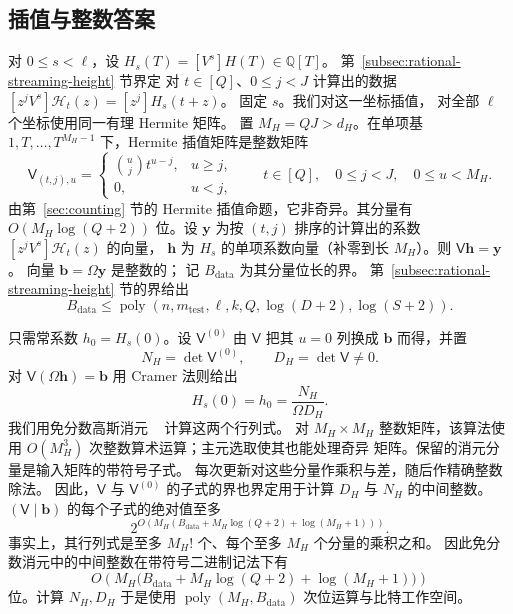 \documentclass[11pt,reqno]{amsart}
\numberwithin{equation}{section}
\theoremstyle{definition}\newtheorem{definition}[theorem]{定义}
\theoremstyle{remark}\newtheorem{remark}[theorem]{注}
\newcommand{\poly}{\operatorname{poly}}
\renewcommand{\le}{\leqslant}
\renewcommand{\ge}{\geqslant}
\begin{document}
\subsection{插值与整数答案}
\label{subsec:rational-readout}
对 $0\le s<\ell$，设 $H_s(T)=[V^s]H(T)\in\mathbb Q[T]$。
第~\ref{subsec:rational-streaming-height} 节界定
对 $t\in[Q]$、$0\le j<J$ 计算出的数据
$[z^jV^s]\mathcal H_t(z)=[z^j]H_s(t+z)$。
固定 $s$。我们对这一坐标插值，
对全部 $\ell$ 个坐标使用同一有理 Hermite 矩阵。
置 $M_H=QJ>d_H$。在单项基
$1,T,\ldots,T^{M_H-1}$ 下，Hermite 插值矩阵是整数矩阵
\[
 \mathsf V_{(t,j),u}=
 \begin{cases}\binom uj t^{u-j},&u\ge j,\\0,&u<j,\end{cases}
 \qquad t\in[Q],\quad 0\le j<J,\quad 0\le u<M_H.
\]
由第~\ref{sec:counting} 节的 Hermite
插值命题，它非奇异。其分量有 $O(M_H\log(Q+2))$
位。设 $\mathbf y$ 为按 $(t,j)$ 排序的计算出的系数
$[z^jV^s]\mathcal H_t(z)$ 的向量，
$\mathbf h$ 为 $H_s$ 的单项系数向量（补零到长
$M_H$）。则 $\mathsf V\mathbf h=\mathbf y$。
向量 $\mathbf b=\Omega\mathbf y$ 是整数的；
记 $B_{\mathrm{data}}$ 为其分量位长的界。
第~\ref{subsec:rational-streaming-height} 节的界给出
\[
 B_{\mathrm{data}}
 \le\poly(n,m_{\mathrm{test}},\ell,k,Q,\log(D+2),\log(S+2)).
\]

只需常系数 $h_0=H_s(0)$。设 $\mathsf V^{(0)}$
由 $\mathsf V$ 把其 $u=0$ 列换成 $\mathbf b$
而得，并置
\[
 N_H=\det\mathsf V^{(0)},\qquad D_H=\det\mathsf V\ne0.
\]
对 $\mathsf V(\Omega\mathbf h)=\mathbf b$
用 Cramer 法则给出
\begin{equation}\label{eq:exact-readout}
 H_s(0)=h_0=\frac{N_H}{\Omega D_H}.
\end{equation}
我们用免分数高斯消元
~\cite[Sections~I--II and~IV--V]{Bareiss68}
计算这两个行列式。
对 $M_H\times M_H$ 整数矩阵，该算法使用
$O(M_H^3)$ 次整数算术运算；主元选取使其也能处理奇异
矩阵。保留的消元分量是输入矩阵的带符号子式。
每次更新对这些分量作乘积与差，随后作精确整数除法。
因此，$\mathsf V$ 与 $\mathsf V^{(0)}$
的子式的界也界定用于计算 $D_H$ 与 $N_H$
的中间整数。
$(\mathsf V\mid\mathbf b)$ 的每个子式的绝对值至多
\[
 2^{O\left(M_H\left(B_{\mathrm{data}}+
                M_H\log(Q+2)+\log(M_H+1)\right)\right)}.
\]
事实上，其行列式是至多 $M_H!$ 个、每个至多 $M_H$
个分量的乘积之和。
因此免分数消元中的中间整数在带符号二进制记法下有
\[
 O\!\left(M_H\bigl(B_{\mathrm{data}}+
                   M_H\log(Q+2)+\log(M_H+1)\bigr)\right)
\]
位。计算 $N_H,D_H$
于是使用 $\poly(M_H,B_{\mathrm{data}})$
次位运算与比特工作空间。
\end{document}
